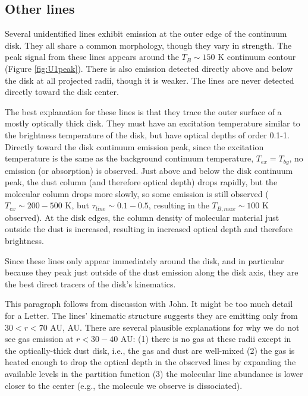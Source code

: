 \documentclass[twocolumn]{aastex61}
\begin{document}

\subsection{Other lines}
\label{sec:otherlines}
Several unidentified lines exhibit emission at the outer edge of the continuum disk.
They all share a common morphology, though they vary in strength.
The peak signal from these lines appears around the $T_B\sim150$ K continuum contour
(Figure \ref{fig:U1peak}).
There is also emission detected directly above and below the disk at all projected
radii, though it is weaker.  The lines are never detected directly toward the disk
center.

The best explanation for these lines is that they trace the outer surface of
a mostly optically thick disk.  They must have an excitation temperature
similar to the brightness temperature of the disk, but have optical depths
of order 0.1-1.  Directly toward the disk continuum emission peak, since
the excitation temperature is the same as the background continuum temperature,
$T_{ex}=T_{bg}$, no emission (or absorption) is observed.  Just above and below
the disk continuum peak, the dust column (and therefore optical depth) drops
rapidly, but the molecular column drops more slowly, so some emission is still
observed ($T_{ex}\sim200-500$ K, but $\tau_{line}\sim0.1-0.5$, resulting in 
the $T_{B,max} \sim 100$ K observed).  At the disk edges, the column density
of molecular material just outside the dust is increased, resulting in increased
optical depth and therefore brightness.

Since these lines only appear immediately around the disk, and in particular
because they peak just outside of the dust emission along the disk axis, they
are the best direct tracers of the disk's kinematics.

{\color{blue} This paragraph follows from discussion with John.  It might
be too much detail for a Letter.}
The lines' kinematic structure suggests they are emitting only from $30 < r < 70$ AU,
AU.  There are several plausible explanations for why we do not see gas
emission at $r<30-40$ AU: (1) there is no gas at these radii except in the
optically-thick dust disk, i.e., the gas and dust are well-mixed (2) the gas is
heated enough to drop the optical depth in the observed lines by expanding the
available levels in the partition function (3) the molecular line abundance is
lower closer to the center (e.g., the molecule we observe is dissociated).
\end{document}
